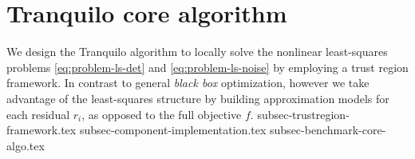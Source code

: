 \section{Tranquilo core algorithm}
\label{sec:tranquilo-core}

We design the Tranquilo algorithm to locally solve the nonlinear least-squares problems \ref{eq:problem-ls-det} and \ref{eq:problem-ls-noise} by employing a trust region framework. In contrast to general \textit{black box} optimization, however we take advantage of the least-squares structure by building approximation models for each residual $r_i$, as opposed to the full objective $f$.
{subsec-trustregion-framework.tex}
{subsec-component-implementation.tex}
{subsec-benchmark-core-algo.tex}
